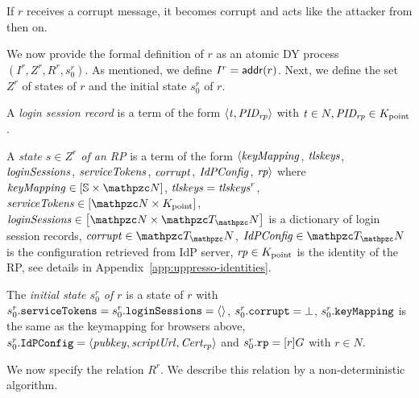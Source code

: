   If $r$ receives a corrupt message, it becomes corrupt and acts like
  the attacker from then on.
  
  We now provide the formal definition of $r$ as an atomic DY process
  $(I^r, Z^r, R^r, s^r_0)$. As mentioned, we define $I^r =
  \mathsf{addr}(r)$. Next, we define the set $Z^r$ of states of
  $r$ and the initial state $s^r_0$ of $r$.
  
  \begin{definition}
    A \emph{login session record} is a term of the form 
    $\langle\mathit{t}, \mathit{PID_{rp}}\rangle$ with 
    $\mathit{t}\in N, \mathit{PID_{rp}}\in K_{\text{point}}$.
  \end{definition}
  
  \begin{sloppypar}
    \begin{definition}\label{def:relying-parties}
      A \emph{state $s\in Z^r$ of an RP} is a term of the form
      $\langle\mathit{keyMapping}$, 
      $\mathit{tlskeys}$, 
      $\mathit{loginSessions}$, 
      $\mathit{serviceTokens}$, 
      $\mathit{corrupt}$, 
      $\mathit{IdPConfig}$, 
      $\mathit{rp}\rangle$ where 
      $\mi{keyMapping} \in \dict{\mathbb{S}}{\nonces}$,
      $\mathit{tlskeys}=\mathit{tlskeys}^r$,
      $\mi{serviceTokens} \in \dict{\nonces}{K_{\text{point}}}$,
      $\mi{loginSessions} \in \dict{\nonces}{\terms}$ 
      is a dictionary of login session records,
      $\mi{corrupt} \in \terms$,
      $\mi{IdPConfig} \in \terms$ 
      is the configuration retrieved from IdP server,
      $\mathit{rp} \in K_{\text{point}}$ is the identity of the RP, 
      see details in Appendix~\ref{app:uppresso-identities}.
  
      The \emph{initial state $s^r_0$ of $r$} is a state of 
      $r$ with $s^r_0.\mathtt{serviceTokens} = 
      s^r_0.\mathtt{loginSessions} = \langle\rangle$,
      $s^r_0.\mathtt{corrupt} = \bot$, 
      $s^r_0.\mathtt{keyMapping}$ 
      is the same as the keymapping for browsers above,
      $s^r_0.\mathtt{IdPConfig} = \langle\mathit{pubkey},\mathit{scriptUrl},\mathit{Cert_{rp}}\rangle$ and
      $s^r_0.\mathtt{rp} = [r]G$ with $r\in N$.
    \end{definition}
  \end{sloppypar}
  
  We now specify the relation $R^r$. We describe this relation by a non-deterministic algorithm. 
  
